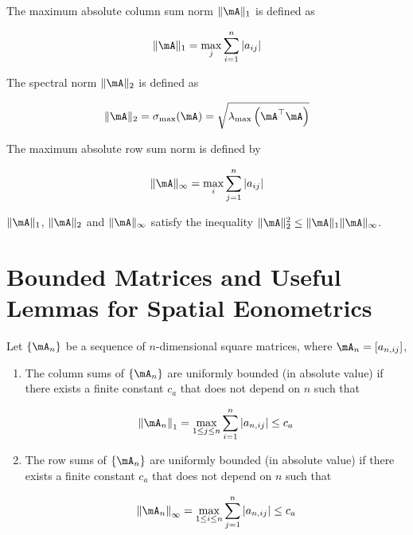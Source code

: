 \documentclass[english,12pt]{book}\usepackage[]{graphicx}\usepackage[]{xcolor}
\begin{document}
The maximum absolute column sum norm $\lVert \mA \rVert_1$ is defined as

\begin{equation}
\lVert \mA \rVert_1 = \max_j\sum_{i = 1}^n\left|a_{ij}\right|
\end{equation}

The spectral norm $\lVert \mA \rVert_2$ is defined as

\begin{equation}
\lVert \mA \rVert_2 = \sigma_{\max}(\mA) = \sqrt{\lambda_{\max}\left(\mA^\top \mA\right)}
\end{equation}

The maximum absolute row sum norm is defined by

\begin{equation}
\lVert \mA \rVert_{\infty} = \max_i\sum_{j = 1}^n\left|a_{ij}\right|
\end{equation}


$\lVert \mA \rVert_1$, $\lVert \mA \rVert_2$ and $\lVert \mA \rVert_{\infty}$ satisfy the inequality $\lVert \mA \rVert_2^2 \leq \lVert \mA \rVert_1\lVert \mA \rVert_{\infty}$.

\section{Bounded Matrices and Useful Lemmas for Spatial Eonometrics}\label{sec:bounded-matrices}

\begin{definition}\label{def:Bounded_Matrices}
Let $\left\lbrace \mA_n \right\rbrace$ be a sequence of $n$-dimensional square matrices, where $\mA_n = \left[a_{n,ij}\right]$,
  \begin{enumerate}
    \item The column sums of $\left\lbrace \mA_n \right\rbrace$ are uniformly bounded (in absolute value) if there exists a finite constant $c_a$ that does not depend on $n$ such that 
    
    \begin{equation*}
      \left\|\mA_n\right\|_{1} = \max_{1 \leq j\leq n}\sum_{i = 1}^n\left|a_{n, ij}\right| \leq c_a
    \end{equation*}
     \item The row sums of $\left\lbrace \mA_n \right\rbrace$ are uniformly bounded (in absolute value) if there exists a finite constant $c_a$ that does not depend on $n$ such that 
    
    \begin{equation*}
      \left\|\mA_n\right\|_{\infty} = \max_{1 \leq i\leq n}\sum_{j = 1}^n\left|a_{n, ij}\right| \leq c_a
    \end{equation*}
  \end{enumerate}
\end{definition}
\end{document}
